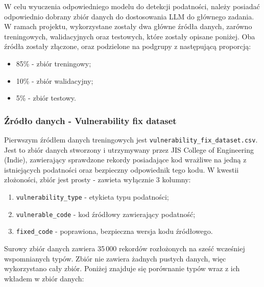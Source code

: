 \documentclass[12pt,a4paper]{article}
\begin{document}
W celu wyuczenia odpowiedniego modelu do detekcji podatności, należy posiadać odpowiednio dobrany zbiór danych do dostosowania
LLM do głównego zadania. W ramach projektu, wykorzystane zostały dwa główne źródła danych, zarówno treningowych, walidacyjnych oraz testowych,
które zostały opisane poniżej. Oba źródła zostały złączone, oraz podzielone na podgrupy z następującą proporcją:
\begin{itemize}
    \item 85\% - zbiór treningowy;
    \item 10\% - zbiór walidacyjny;
    \item 5\% - zbiór testowy.
\end{itemize} 

\subsubsection{Źródło danych - Vulnerability fix dataset}

Pierwszym źródłem danych treningowych jest \texttt{vulnerability\_fix\_dataset.csv}. Jest to zbiór danych stworzony i utrzymywany przez JIS College of Engineering (Indie),
zawierający sprawdzone rekordy posiadające kod wrażliwe na jedną z istniejących podatności oraz bezpieczny odpowiednik tego kodu. W kwestii złożoności, zbiór jest
prosty - zawieta wyłącznie 3 kolumny:
\begin{enumerate}
    \item \texttt{vulnerability\_type} - etykieta typu podatności;
    \item \texttt{vulnerable\_code} - kod źródłowy zawierający podatność;
    \item \texttt{fixed\_code} - poprawiona, bezpieczna wersja kodu źródłowego.
\end{enumerate}

Surowy zbiór danych zawiera 35\,000 rekordów rozłożonych na sześć wcześniej wspomnianych typów. Zbiór nie zawiera żadnych pustych danych, więc wykorzystano cały zbiór.
Poniżej znajduje się porównanie typów wraz z ich wkładem w zbiór danych:
\end{document}
